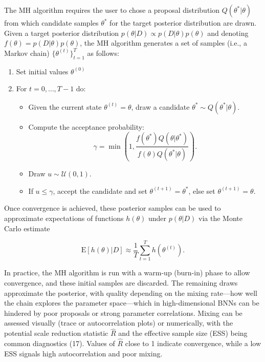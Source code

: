 \documentclass[
  a4paper,
]{scrreprt}
\providecommand{\tightlist}{%
  \setlength{\itemsep}{0pt}\setlength{\parskip}{0pt}}
\begin{document}
The MH algorithm requires the user to chose a proposal distribution
\(Q(\theta^{*}|\theta)\) from which candidate samples \(\theta^{*}\) for
the target posterior distribution are drawn. Given a target posterior
distribution \(p(\theta|D) \propto p(D|\theta)p(\theta)\) and denoting
\(f(\theta)=p(D|\theta)p(\theta)\), the MH algorithm generates a set of
samples (i.e., a Markov chain) \(\{\theta^{(t)}\}_{t=1}^T\) as follows:

\begin{enumerate}
\def\labelenumi{\arabic{enumi}.}
\tightlist
\item
  Set initial values \(\theta^{(0)}\)
\item
  For \(t = 0, \dots, T-1\) do:

  \begin{itemize}
  \tightlist
  \item
    Given the current state \(\theta^{(t)}=\theta\), draw a candidate
    \(\theta^{*} \sim Q(\theta^{*} | \theta)\).
  \item
    Compute the acceptance probability: \[
     \gamma = \min\left(1, \frac{f(\theta^{*})Q(\theta|\theta^{*})}{f(\theta)Q(\theta^{*}|\theta)}\right).
     \]
  \item
    Draw \(u \sim \mathcal{U}(0,1)\).
  \item
    If \(u \leq \gamma\), accept the candidate and set
    \(\theta^{(t+1)}=\theta^{*}\), else set \(\theta^{(t+1)}=\theta\).
  \end{itemize}
\end{enumerate}

Once convergence is achieved, these posterior samples can be used to
approximate expectations of functions \(h(\theta)\) under
\(p(\theta|D)\) via the Monte Carlo estimate

\[
\text{E}[h(\theta)|D] \approx \frac{1}{T} \sum_{t=1}^T h(\theta^{(t)}).
\]

In practice, the MH algorithm is run with a warm-up (burn-in) phase to
allow convergence, and these initial samples are discarded. The
remaining draws approximate the posterior, with quality depending on the
mixing rate---how well the chain explores the parameter space---which in
high-dimensional BNNs can be hindered by poor proposals or strong
parameter correlations. Mixing can be assessed visually (trace or
autocorrelation plots) or numerically, with the potential scale
reduction statistic \(\hat{R}\) and the effective sample size (ESS)
being common diagnostics (17). Values of \(\hat{R}\) close to 1 indicate
convergence, while a low ESS signals high autocorrelation and poor
mixing.
\end{document}
